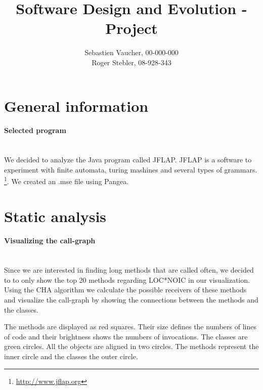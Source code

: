 \documentclass{paper}
\title{Software Design and Evolution - Project}
\author{Sebastien Vaucher, 00-000-000\\Roger Stebler, 08-928-343}
\begin{document}
\maketitle


%

\section{General information}

\paragraph{Selected program}\mbox{}\vspace{10pt}\\
We decided to analyze the Java program called JFLAP. JFLAP is a software to experiment with finite automata, turing mashines and several types of grammars. \footnote{\url{http://www.jflap.org}}. We created an .mse file using Pangea.


\section{Static analysis}

\paragraph{Visualizing the call-graph}\mbox{}\vspace{10pt}\\
Since we are interested in finding long methods that are called often, we decided to to only show the top 20 methods regarding LOC*NOIC in our visualization. Using the CHA algorithm we calculate the possible receivers of these methods and visualize the call-graph by showing the connections between the methods and the classes.


The methods are displayed as red squares. Their size defines the numbers of lines of code and their brightness shows the numbers of invocations. The classes are green circles. All the objects are aligned in two circles. The methods represent the inner circle and the classes the outer circle.
\end{document}
